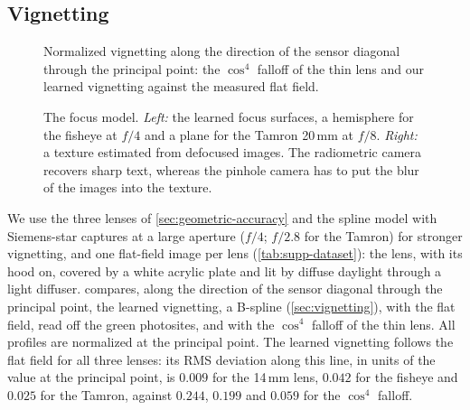 \subsection{Vignetting}
\label{sec:experiment-vignetting}
\begin{figure}[t]
        \centering
        
        \caption{Normalized vignetting along the direction of the sensor diagonal through the principal point: the $\cos^4$ falloff of the thin lens and our learned vignetting against the measured flat field.}
        \label{fig:vignetting}
\end{figure}
\begin{figure}[t]
        \centering
        \begin{minipage}[c]{0.43\textwidth}
                \centering
                
        \end{minipage}\hfill
        \begin{minipage}[c]{0.54\textwidth}
                \centering
                
        \end{minipage}
        \caption{The focus model. \emph{Left:} the learned focus surfaces, a hemisphere for the fisheye at $f/4$ and a plane for the Tamron 20\,mm at $f/8$. \emph{Right:} a texture estimated from defocused images. The radiometric camera recovers sharp text, whereas the pinhole camera has to put the blur of the images into the texture.}
        \label{fig:focus-surfaces}
        \label{fig:texture-learned}
\end{figure}
We use the three lenses of \cref{sec:geometric-accuracy} and the
spline model with Siemens-star captures at a large aperture ($f/4$; $f/2.8$ for the
Tamron) for stronger vignetting, and one flat-field image per lens
(\cref{tab:supp-dataset}): the lens, with its hood on, covered by a
white acrylic plate and lit by diffuse daylight through a light
diffuser.  compares, along the
direction of the sensor diagonal through the principal point, the
learned vignetting, a B-spline (\cref{sec:vignetting}),
with the flat field, read off the green photosites, and with the
$\cos^4$ falloff of the thin lens. All profiles are normalized at the
principal point. The learned vignetting follows the flat field for all
three lenses: its RMS deviation along this line, in units of the
value at the principal point, is $0.009$ for the 14\,mm lens, $0.042$ for the
fisheye and $0.025$ for the Tamron, against $0.244$, $0.199$ and
$0.059$ for the $\cos^4$ falloff.


